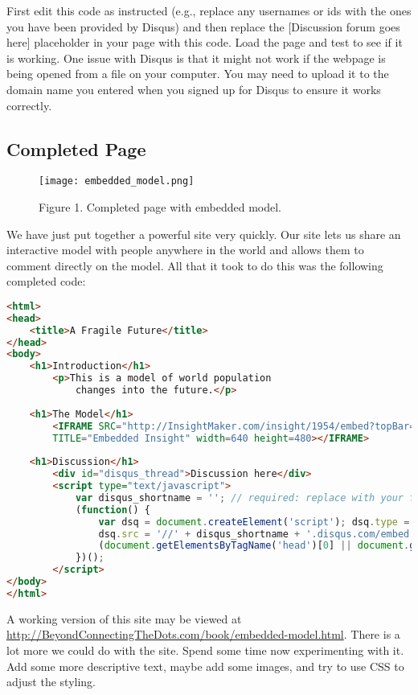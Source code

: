 \documentclass[]{memoir}
\let\Oldincludegraphics\includegraphics
\renewcommand{\includegraphics}[1]{\Oldincludegraphics[max size={\textwidth}{\textheight}]{#1}}
\begin{document}
First edit this code as instructed (e.g., replace any usernames or ids
with the ones you have been provided by Disqus) and then replace the
{[}Discussion forum goes here{]} placeholder in your page with this
code. Load the page and test to see if it is working. One issue with
Disqus is that it might not work if the webpage is being opened from a
file on your computer. You may need to upload it to the domain name you
entered when you signed up for Disqus to ensure it works correctly.

\subsection{Completed Page}

\begin{figure}[htbp]
\centering
\texttt{[image: embedded\_model.png]}
\caption{Figure 1. Completed page with embedded model.}
\end{figure}

We have just put together a powerful site very quickly. Our site lets us
share an interactive model with people anywhere in the world and allows
them to comment directly on the model. All that it took to do this was
the following completed code:

\begin{lstlisting}[language=HTML]
<html>
<head>
    <title>A Fragile Future</title>
</head>
<body>
    <h1>Introduction</h1>
        <p>This is a model of world population
            changes into the future.</p>
            
    <h1>The Model</h1>
        <IFRAME SRC="http://InsightMaker.com/insight/1954/embed?topBar=1&sideBar=1&zoom=1"
        TITLE="Embedded Insight" width=640 height=480></IFRAME>
        
    <h1>Discussion</h1>
        <div id="disqus_thread">Discussion here</div>
        <script type="text/javascript">
            var disqus_shortname = ''; // required: replace with your forum shortname
            (function() {
                var dsq = document.createElement('script'); dsq.type = 'text/javascript'; dsq.async = true;
                dsq.src = '//' + disqus_shortname + '.disqus.com/embed.js';
                (document.getElementsByTagName('head')[0] || document.getElementsByTagName('body')[0]).appendChild(dsq);
            })();
        </script>     
</body>
</html>
\end{lstlisting}

A working version of this site may be viewed at
\url{http://BeyondConnectingTheDots.com/book/embedded-model.html}. There
is a lot more we could do with the site. Spend some time now
experimenting with it. Add some more descriptive text, maybe add some
images, and try to use CSS to adjust the styling.
\end{document}
